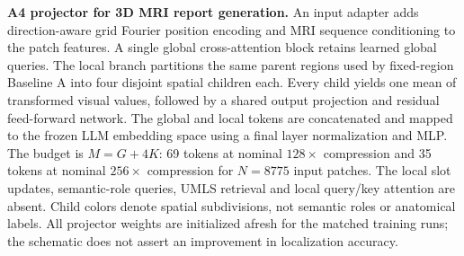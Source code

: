 \caption{\textbf{A4 projector for 3D MRI report generation.}
An input adapter adds direction-aware grid Fourier position encoding and MRI
sequence conditioning to the patch features. A single global cross-attention
block retains learned global queries. The local branch partitions the same
parent regions used by fixed-region Baseline A into four disjoint spatial
children each. Every child yields one mean of transformed visual values,
followed by a shared output projection and residual feed-forward network.
The global and local tokens are concatenated and mapped to the frozen LLM
embedding space using a final layer normalization and MLP.
The budget is $M=G+4K$: 69 tokens at nominal $128\times$ compression and
35 tokens at nominal $256\times$ compression for $N=8775$ input patches.
The local slot updates, semantic-role queries, UMLS retrieval and local
query/key attention are absent. Child colors denote spatial subdivisions,
not semantic roles or anatomical labels. All projector weights are initialized
afresh for the matched training runs; the schematic does not assert an
improvement in localization accuracy.}
\label{fig:a4-projector}
